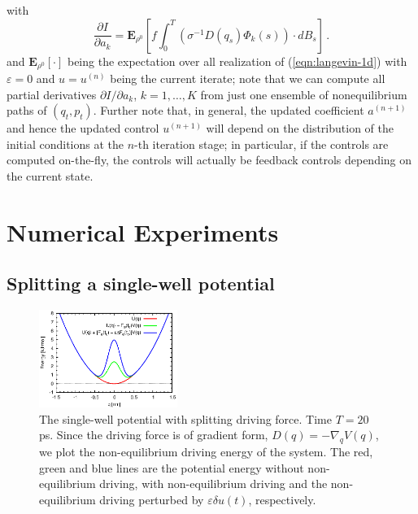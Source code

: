 \documentclass[]{tMPH2e}
\newcommand{\eps}{\varepsilon}
\newcommand{\bE}{{\mathbf E}}
\begin{document}
with
\begin{equation}\label{dida}
\frac{\partial I}{\partial a_{k}} = \bE_{\rho^0}\left[f\int_{0}^{T}(\sigma^{-1}D(q_{s})\Phi_{k}(s))\cdot dB_{s} \right]\,.
\end{equation}
and $\bE_{\rho^0}[\cdot]$ being the expectation over all realization of (\ref{eqn:langevin-1d}) with $\eps=0$ and $u=u^{(n)}$ being the current iterate; note that we can compute all partial derivatives $\partial I/\partial a_k$, $k=1,\ldots,K$ from just one ensemble of nonequilibrium paths of $(q_{t},p_{t})$. Further note that, in general, the updated coefficient $a^{(n+1)}$ and hence the updated control $u^{(n+1)}$ will depend on the distribution of the initial conditions at the $n$-th iteration stage; in particular, if the controls are computed on-the-fly, the controls will actually be feedback controls depending on the current state.    





\section{Numerical Experiments}

\subsection{Splitting a single-well potential}

\begin{figure}
  \centering
  \includegraphics[width=0.4\textwidth]{figs/fig-split-pot.eps}
  \caption{The single-well potential with  splitting driving
    force. Time $T = 20$ ps.  Since the driving force is
    of gradient form, $ D( q) = -\nabla_{q}V( q)$,
    we plot the non-equilibrium driving energy of the system.  The red,
    green and blue lines are the potential energy without
    non-equilibrium driving, with non-equilibrium driving and
    the non-equilibrium driving perturbed by $\eps\delta u(t)$,
    respectively.  }
  \label{fig:tmp4}
\end{figure}
\end{document}
